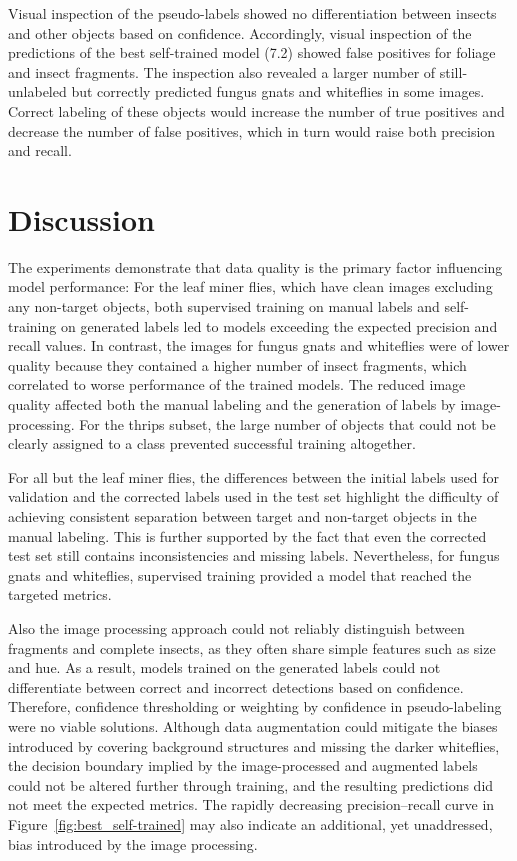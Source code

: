 \documentclass[12pt, a4paper]{article}
\begin{document}
Visual inspection of the pseudo-labels showed no differentiation between insects and other objects based on confidence. Accordingly, visual inspection of the predictions of the best self-trained model (7.2) showed false positives for foliage and insect fragments. The inspection also revealed a larger number of still-unlabeled but correctly predicted fungus gnats and whiteflies in some images. Correct labeling of these objects would increase the number of true positives and decrease the number of false positives, which in turn would raise both precision and recall.

\section{Discussion}

The experiments demonstrate that data quality is the primary factor influencing model performance: For the leaf miner flies, which have clean images excluding any non-target objects, both supervised training on manual labels and self-training on generated labels led to models exceeding the expected precision and recall values. In contrast, the images for fungus gnats and whiteflies were of lower quality because they contained a higher number of insect fragments, which correlated to worse performance of the trained models. The reduced image quality affected both the manual labeling and the generation of labels by image-processing. For the thrips subset, the large number of objects that could not be clearly assigned to a class prevented successful training altogether.

For all but the leaf miner flies, the differences between the initial labels used for validation and the corrected labels used in the test set highlight the difficulty of achieving consistent separation between target and non-target objects in the manual labeling. This is further supported by the fact that even the corrected test set still contains inconsistencies and missing labels. Nevertheless, for fungus gnats and whiteflies, supervised training provided a model that reached the targeted metrics.

Also the image processing approach could not reliably distinguish between fragments and complete insects, as they often share simple features such as size and hue. As a result, models trained on the generated labels could not differentiate between correct and incorrect detections based on confidence. Therefore, confidence thresholding or weighting by confidence in pseudo-labeling were no viable solutions. Although data augmentation could mitigate the biases introduced by covering background structures and missing the darker whiteflies, the decision boundary implied by the image-processed and augmented labels could not be altered further through training, and the resulting predictions did not meet the expected metrics. The rapidly decreasing precision–recall curve in Figure~\ref{fig:best_self-trained} may also indicate an additional, yet unaddressed, bias introduced by the image processing.
\end{document}
